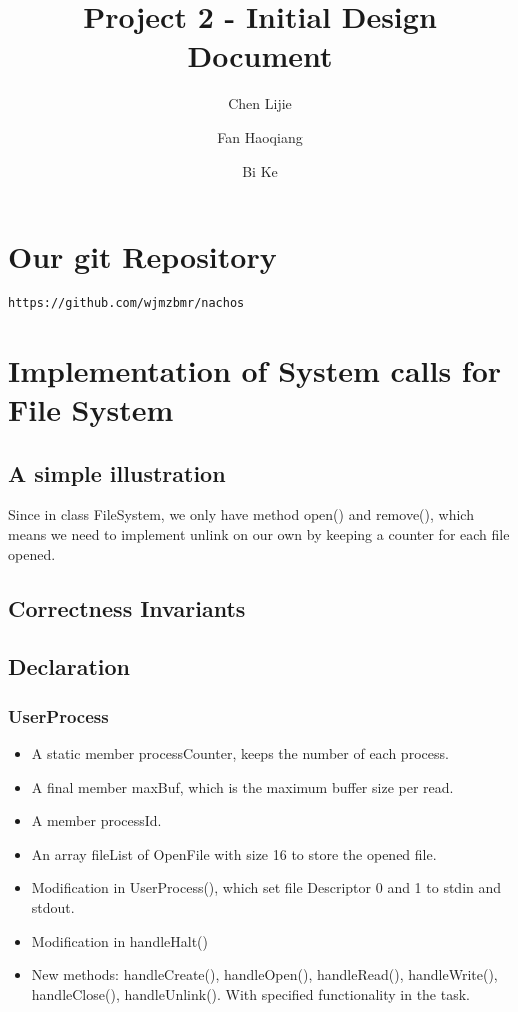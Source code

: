 \documentclass{article}
\title{Project 2 - Initial Design Document}
\author{Chen Lijie\\ \and
	Fan Haoqiang\\ \and
	Bi Ke\\ }
\date{}
\begin{document}
	\maketitle
	\tableofcontents
	\section{Our git Repository}
	\texttt{https://github.com/wjmzbmr/nachos}
	\newpage
	\section{Implementation of System calls for File System}
	\subsection{A simple illustration}
	Since in class FileSystem, we only have method open() and remove(), which means we need to implement unlink on our own by keeping a counter for each file opened.
	\subsection{Correctness Invariants}
	\subsection{Declaration}
	\subsubsection*{UserProcess}
	\begin{itemize}
		\item A static member processCounter, keeps the number of each process.
		\item A final member maxBuf, which is the maximum buffer size per read.
		\item A member processId.
		\item An array fileList of OpenFile with size 16 to store the opened file.
		\item Modification in UserProcess(), which set file Descriptor 0 and 1 to stdin and stdout.
		\item Modification in handleHalt()
		\item New methods: handleCreate(), handleOpen(), handleRead(), handleWrite(), handleClose(), handleUnlink(). With specified functionality in the task.
	\end{itemize}
\end{document}
